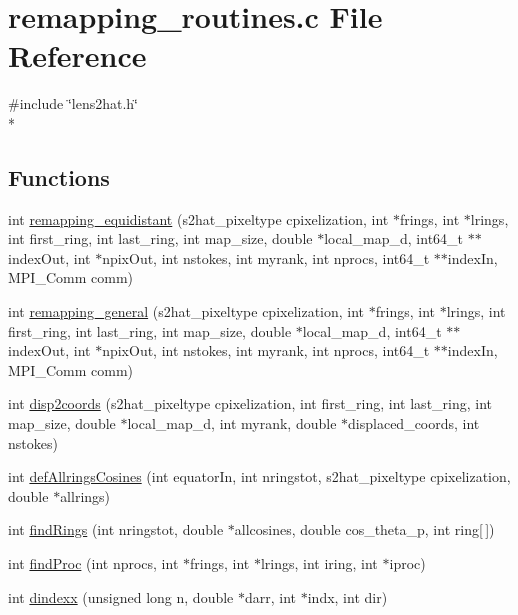 \section{remapping\-\_\-routines.\-c File Reference}
\label{rng_2common_2remapping__routines_8c}
{\ttfamily \#include \char`\"{}lens2hat.\-h\char`\"{}}\\*
\subsection*{Functions}
\begin{DoxyCompactItemize}
\item 
int \hyperlink{rng_2common_2remapping__routines_8c_a2b210958001ebd22c4db83db3b89be97}{remapping\-\_\-equidistant} (s2hat\-\_\-pixeltype cpixelization, int $\ast$frings, int $\ast$lrings, int first\-\_\-ring, int last\-\_\-ring, int map\-\_\-size, double $\ast$local\-\_\-map\-\_\-d, int64\-\_\-t $\ast$$\ast$index\-Out, int $\ast$npix\-Out, int nstokes, int myrank, int nprocs, int64\-\_\-t $\ast$$\ast$index\-In, M\-P\-I\-\_\-\-Comm comm)
\item 
int \hyperlink{rng_2common_2remapping__routines_8c_abcde5d8037e169459e89439cc4d5e43c}{remapping\-\_\-general} (s2hat\-\_\-pixeltype cpixelization, int $\ast$frings, int $\ast$lrings, int first\-\_\-ring, int last\-\_\-ring, int map\-\_\-size, double $\ast$local\-\_\-map\-\_\-d, int64\-\_\-t $\ast$$\ast$index\-Out, int $\ast$npix\-Out, int nstokes, int myrank, int nprocs, int64\-\_\-t $\ast$$\ast$index\-In, M\-P\-I\-\_\-\-Comm comm)
\item 
int \hyperlink{rng_2common_2remapping__routines_8c_a8224d455c626532938c1729f5e62daee}{disp2coords} (s2hat\-\_\-pixeltype cpixelization, int first\-\_\-ring, int last\-\_\-ring, int map\-\_\-size, double $\ast$local\-\_\-map\-\_\-d, int myrank, double $\ast$displaced\-\_\-coords, int nstokes)
\item 
int \hyperlink{rng_2common_2remapping__routines_8c_af6cfda4741a11339b5a1d9c599411b87}{def\-Allrings\-Cosines} (int equator\-In, int nringstot, s2hat\-\_\-pixeltype cpixelization, double $\ast$allrings)
\item 
int \hyperlink{rng_2common_2remapping__routines_8c_a95c082e86d6e644f4789485021f90235}{find\-Rings} (int nringstot, double $\ast$allcosines, double cos\-\_\-theta\-\_\-p, int ring\mbox{[}$\,$\mbox{]})
\item 
int \hyperlink{rng_2common_2remapping__routines_8c_af4ba917a5b9f32394911c8d28d6c2d07}{find\-Proc} (int nprocs, int $\ast$frings, int $\ast$lrings, int iring, int $\ast$iproc)
\item 
int \hyperlink{rng_2common_2remapping__routines_8c_ad574f0dfca1f8db2b630a9b6cf3a45c9}{dindexx} (unsigned long n, double $\ast$darr, int $\ast$indx, int dir)
\end{DoxyCompactItemize}


